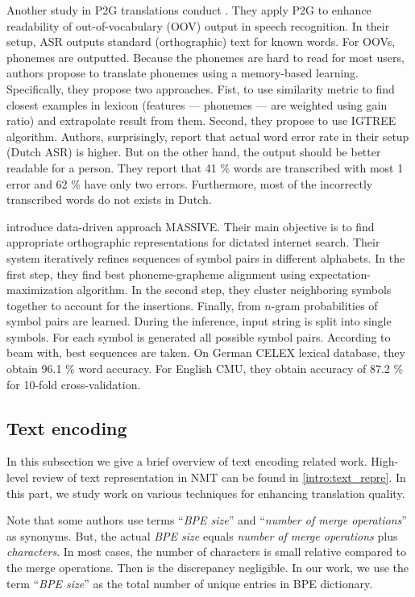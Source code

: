 Another study in P2G translations conduct . They apply P2G to enhance readability of out-of-vocabulary (OOV) output in speech recognition. In their setup, ASR outputs standard (orthographic) text for known words. For OOVs, phonemes are outputted. Because the phonemes are hard to read for most users, authors propose to translate phonemes using a memory-based learning. Specifically, they propose two approaches. Fist, to use similarity metric to find closest examples in lexicon (features --- phonemes --- are weighted using gain ratio) and extrapolate result from them. Second, they propose to use IGTREE algorithm. Authors, surprisingly, report that actual word error rate in their setup (Dutch ASR) is higher. But on the other hand, the output should be better readable for a person. They report that 41 \% words are transcribed with most 1 error and 62 \% have only two errors. Furthermore, most of the incorrectly transcribed words do not exists in Dutch.

 introduce data-driven approach MASSIVE. Their main objective is to find appropriate orthographic representations for dictated internet search. Their system iteratively refines sequences of symbol pairs in different alphabets. In the first step, they find best phoneme-grapheme alignment using expectation-maximization algorithm. In the second step, they cluster neighboring symbols together to account for the insertions. Finally, from $n$-gram probabilities of symbol pairs are learned. During the inference, input string is split into single symbols. For each symbol is generated all possible symbol pairs. According to beam with, best sequences are taken. On German CELEX lexical database, they obtain 96.1 \% word accuracy. For English CMU, they obtain accuracy of 87.2 \% for 10-fold cross-validation.

\subsection{Text encoding}
\label{easr:re_encoding}
In this subsection we give a brief overview of text encoding related work. High-level review of text representation in NMT can be found in \cref{intro:text_repre}. In this part, we study work on various techniques for enhancing translation quality. 

Note that some authors use terms ``\textit{BPE size}'' and ``\textit{number of merge operations}'' as synonyms. But, the actual \textit{BPE size} equals \textit{number of merge operations} plus \textit{characters}. In most cases, the number of characters is small relative compared to the merge operations. Then is the discrepancy negligible. In our work, we use the term ``\textit{BPE size}'' as the total number of unique entries in BPE dictionary.

